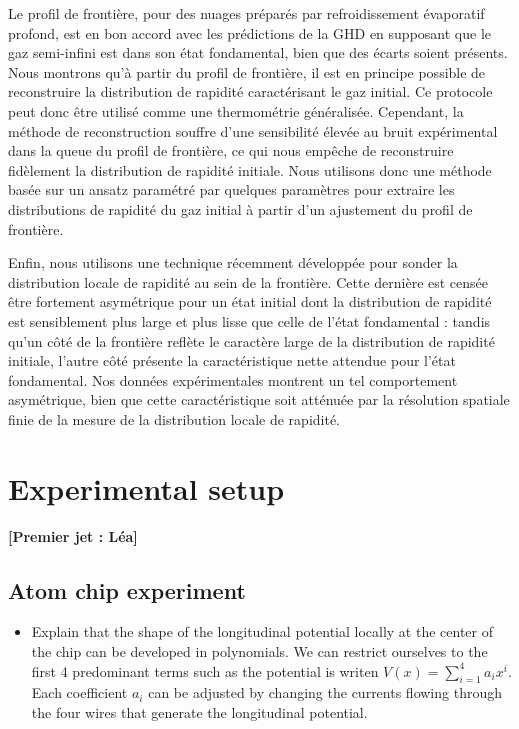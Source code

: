 \documentclass[submission, Phys]{SciPost}
\begin{document}
{Le profil de frontière, pour des nuages préparés par refroidissement évaporatif profond, est en bon accord avec les prédictions de la GHD en supposant que le gaz semi-infini est dans son état fondamental, bien que des écarts soient présents. Nous montrons qu'à partir du profil de frontière, il est en principe possible de reconstruire la distribution de rapidité caractérisant le gaz initial. Ce protocole peut donc être utilisé comme une thermométrie généralisée. Cependant, la méthode de reconstruction souffre d'une sensibilité élevée au bruit expérimental dans la queue du profil de frontière, ce qui nous empêche de reconstruire fidèlement la distribution de rapidité initiale. Nous utilisons donc une méthode basée sur un ansatz paramétré par quelques paramètres pour extraire les distributions de rapidité du gaz initial à partir d'un ajustement du profil de frontière.

Enfin, nous utilisons une technique récemment développée\cite{dubois_probing_2024} pour sonder la distribution locale de rapidité au sein de la frontière. Cette dernière est censée être fortement asymétrique pour un état initial dont la distribution de rapidité est sensiblement plus large et plus lisse que celle de l'état fondamental : tandis qu'un côté de la frontière reflète le caractère large de la distribution de rapidité initiale, l'autre côté présente la caractéristique nette attendue pour l'état fondamental. Nos données expérimentales montrent un tel comportement asymétrique, bien que cette caractéristique soit atténuée par la résolution spatiale finie de la mesure de la distribution locale de rapidité.

}


\section{Experimental setup}
{\bf [Premier jet : Léa]}
\subsection{Atom chip experiment}
\begin{itemize}
    \item Explain that the shape of the longitudinal potential locally at the center of the chip can be developed in polynomials. We can restrict ourselves to the first 4 predominant terms such as the potential is writen $V(x) = \sum_{i=1}^{4} a_i x^i$. Each coefficient $a_i$ can be adjusted by changing the currents flowing through the four wires that generate the longitudinal potential.
\end{itemize}
\end{document}
